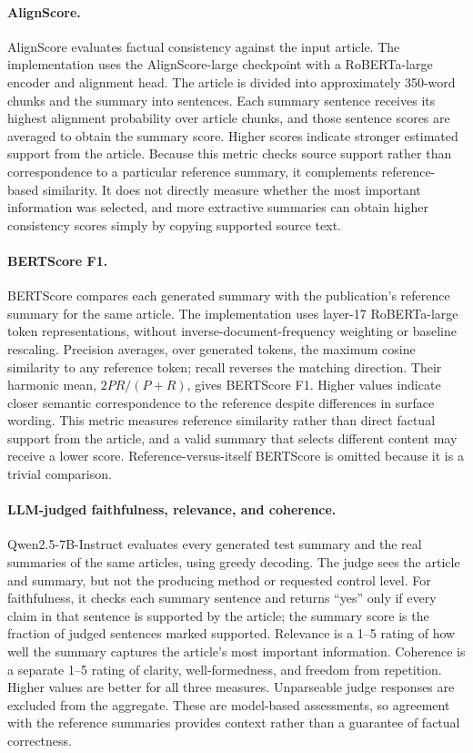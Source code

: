 \documentclass[11pt]{article}
\begin{document}
\paragraph{AlignScore.}
AlignScore evaluates factual consistency against the input article. The implementation uses the AlignScore-large checkpoint with a RoBERTa-large encoder and alignment head. The article is divided into approximately 350-word chunks and the summary into sentences. Each summary sentence receives its highest alignment probability over article chunks, and those sentence scores are averaged to obtain the summary score. Higher scores indicate stronger estimated support from the article. Because this metric checks source support rather than correspondence to a particular reference summary, it complements reference-based similarity. It does not directly measure whether the most important information was selected, and more extractive summaries can obtain higher consistency scores simply by copying supported source text.

\paragraph{BERTScore F1.}
BERTScore compares each generated summary with the publication's reference summary for the same article. The implementation uses layer-17 RoBERTa-large token representations, without inverse-document-frequency weighting or baseline rescaling. Precision averages, over generated tokens, the maximum cosine similarity to any reference token; recall reverses the matching direction. Their harmonic mean, $2PR/(P+R)$, gives BERTScore F1. Higher values indicate closer semantic correspondence to the reference despite differences in surface wording. This metric measures reference similarity rather than direct factual support from the article, and a valid summary that selects different content may receive a lower score. Reference-versus-itself BERTScore is omitted because it is a trivial comparison.

\paragraph{LLM-judged faithfulness, relevance, and coherence.}
Qwen2.5-7B-Instruct evaluates every generated test summary and the real summaries of the same articles, using greedy decoding. The judge sees the article and summary, but not the producing method or requested control level. For faithfulness, it checks each summary sentence and returns ``yes'' only if every claim in that sentence is supported by the article; the summary score is the fraction of judged sentences marked supported. Relevance is a 1--5 rating of how well the summary captures the article's most important information. Coherence is a separate 1--5 rating of clarity, well-formedness, and freedom from repetition. Higher values are better for all three measures. Unparseable judge responses are excluded from the aggregate. These are model-based assessments, so agreement with the reference summaries provides context rather than a guarantee of factual correctness.
\end{document}
